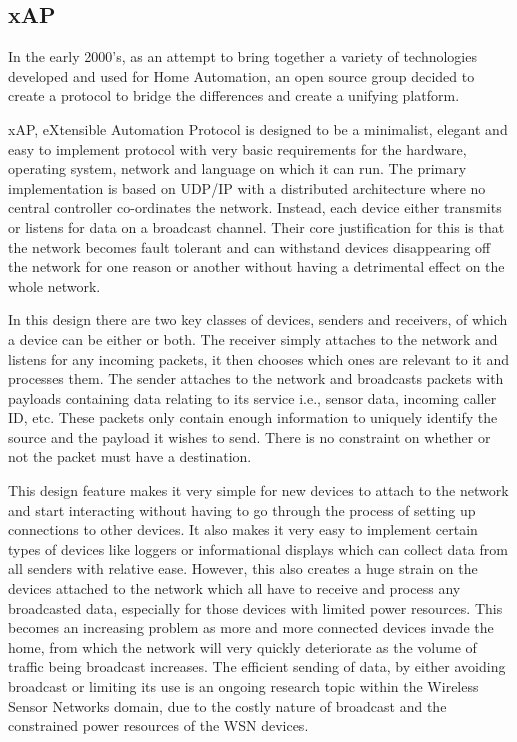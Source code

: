 \subsection{xAP} %
\label{sub:xap}

In the early 2000's, as an attempt to bring together a variety of technologies developed and used for Home Automation, an open source group decided to create a protocol to bridge the differences and create a unifying platform.\cite{xAP,xAProtocol}

xAP, eXtensible Automation Protocol is designed to be a minimalist, elegant and easy to implement protocol with very basic requirements for the hardware, operating system, network and language on which it can run.  
The primary implementation is based on UDP/IP with a distributed architecture where no central controller co-ordinates the network. Instead, each device either transmits or listens for data on a broadcast channel. Their core justification for this is that the network becomes fault tolerant and can withstand devices disappearing off the network for one reason or another without having a detrimental effect on the whole network.

In this design there are two key classes of devices, senders and receivers, of which a device can be either or both. 
The receiver simply attaches to the network and listens for any incoming packets, it then chooses which ones are relevant to it and processes them.
The sender attaches to the network and broadcasts packets with payloads containing data relating to its service i.e., sensor data, incoming caller ID, etc. These packets only contain enough information to uniquely identify the source and the payload it wishes to send. There is no constraint on whether or not the packet must have a destination.

This design feature makes it very simple for new devices to attach to the network and start interacting without having to go through the process of setting up connections to other devices. It also makes it very easy to implement certain types of devices like loggers or informational displays which can collect data from all senders with relative ease. However, this also creates a huge strain on the devices attached to the network which all have to receive and process any broadcasted data, especially for those devices with limited power resources. This becomes an increasing problem as more and more connected devices invade the home, from which the network will very quickly deteriorate as the volume of traffic being broadcast increases. The efficient sending of data, by either avoiding broadcast or limiting its use is an ongoing research topic within the Wireless Sensor Networks domain, due to the costly nature of broadcast and the constrained power resources of the WSN devices.\cite{RumourRouting}\cite{DirectedDiffusion}

